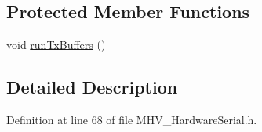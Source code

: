 \subsection*{\-Protected \-Member \-Functions}
\begin{DoxyCompactItemize}
\item 
void \hyperlink{class_m_h_v___hardware_serial_a8801ff1e85b487e233737a9591131f02}{run\-Tx\-Buffers} ()
\end{DoxyCompactItemize}


\subsection{\-Detailed \-Description}


\-Definition at line 68 of file \-M\-H\-V\-\_\-\-Hardware\-Serial.\-h.



